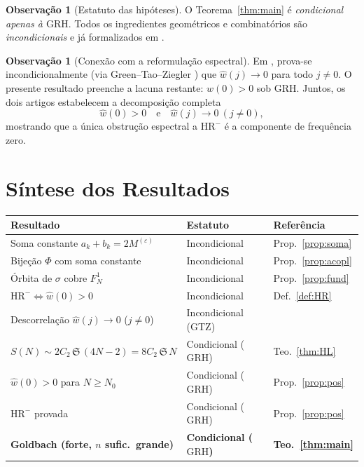 \documentclass[12pt,a4paper]{article}
\theoremstyle{definition}
\newtheorem{remark}[theorem]{Observação}
\newcommand{\HRm}{\mathrm{HR}^{-}}
\newcommand{\GRH}{\mathrm{GRH}}
\newcommand{\Ss}{\mathfrak{S}}         %
\newcommand{\1}[1]{\mathbf{1}_{#1}}
\begin{document}
	\begin{remark}[Estatuto das hipóteses]
		O Teorema~\ref{thm:main} é \emph{condicional apenas à $\GRH$}.
		Todos os ingredientes geométricos e combinatórios são \emph{incondicionais}
		e já formalizados em \cite{motor,espectral}.
	\end{remark}
	
	\begin{remark}[Conexão com a reformulação espectral]
		Em \cite{espectral}, prova-se incondicionalmente (via Green--Tao--Ziegler
		\cite{greentaoziegler}) que $\widehat{w}(j) \to 0$ para todo $j \neq 0$.
		O presente resultado preenche a lacuna restante: $\widehat{w}(0) > 0$
		sob $\GRH$. Juntos, os dois artigos estabelecem a decomposição completa
		\[
		\widehat{w}(0) > 0 \quad\text{e}\quad \widehat{w}(j) \to 0\ (j\neq 0),
		\]
		mostrando que a única obstrução espectral a $\HRm$ é a componente de
		frequência zero.
	\end{remark}
	
	\section{Síntese dos Resultados}
	\label{sec:sintese}
	
	\begin{center}
		\renewcommand{\arraystretch}{1.4}
		\begin{tabular}{lll}
			\toprule
			\textbf{Resultado} & \textbf{Estatuto} & \textbf{Referência} \\
			\midrule
			Soma constante $a_k + b_k = 2M^{(\varepsilon)}$
			& Incondicional & Prop.~\ref{prop:soma} \\
			Bijeção $\Phi$ com soma constante
			& Incondicional & Prop.~\ref{prop:acopl} \\
			Órbita de $\sigma$ cobre $F_N^1$
			& Incondicional & Prop.~\ref{prop:fund} \\
			$\HRm \Leftrightarrow \widehat{w}(0) > 0$
			& Incondicional & Def.~\ref{def:HR} \\
			Descorrelação $\widehat{w}(j) \to 0$ ($j \neq 0$)
			& Incondicional (GTZ) & \cite{espectral} \\
			$S(N) \sim 2C_2\,\Ss\,(4N-2) = 8C_2\,\Ss\,N$
			& Condicional ($\GRH$) & Teo.~\ref{thm:HL} \\
			$\widehat{w}(0) > 0$ para $N \geq N_0$
			& Condicional ($\GRH$) & Prop.~\ref{prop:pos} \\
			$\HRm$ provada
			& Condicional ($\GRH$) & Prop.~\ref{prop:pos} \\
			\midrule
			\textbf{Goldbach (forte, $n$ sufic.\ grande)}
			& \textbf{Condicional ($\GRH$)} & \textbf{Teo.~\ref{thm:main}} \\
			\bottomrule
		\end{tabular}
	\end{center}
	
\end{document}
